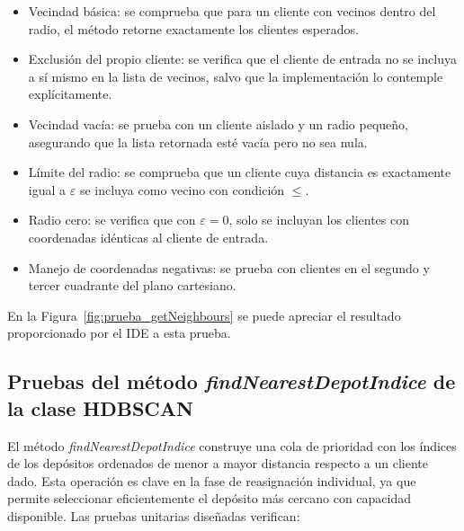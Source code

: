 \begin{itemize}
  \item Vecindad b\'asica: se comprueba que para un cliente con vecinos dentro del radio, el m\'etodo retorne exactamente los clientes esperados.
  \item Exclusi\'on del propio cliente: se verifica que el cliente de entrada no se incluya a s\'i mismo en la lista de vecinos, salvo que la implementaci\'on lo contemple expl\'icitamente.
  \item Vecindad vac\'ia: se prueba con un cliente aislado y un radio peque\~no, asegurando que la lista retornada est\'e vac\'ia pero no sea nula.
  \item L\'imite del radio: se comprueba que un cliente cuya distancia es exactamente igual a \(\varepsilon\) se incluya como vecino con condici\'on \(\leq\).
  \item Radio cero: se verifica que con \(\varepsilon = 0\), solo se incluyan los clientes con coordenadas id\'enticas al cliente de entrada.
  \item Manejo de coordenadas negativas: se prueba con clientes en el segundo y tercer cuadrante del plano cartesiano.
\end{itemize}

En la Figura~\ref{fig:prueba_getNeighbours} se puede apreciar el resultado proporcionado por el IDE a esta prueba.


\subsection{Pruebas del m\'etodo \textit{findNearestDepotIndice} de la clase HDBSCAN}

El m\'etodo \textit{findNearestDepotIndice} construye una cola de prioridad con los \'indices de los dep\'ositos ordenados de menor a mayor distancia respecto a un cliente dado. Esta operaci\'on es clave en la fase de reasignaci\'on individual, ya que permite seleccionar eficientemente el dep\'osito m\'as cercano con capacidad disponible. Las pruebas unitarias dise\~nadas verifican:

